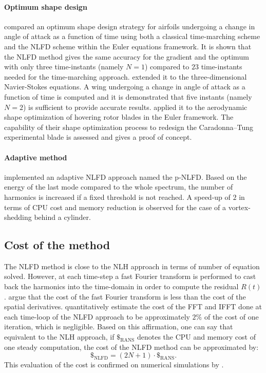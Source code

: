 \paragraph{Optimum shape design}
\citet{Nadarajah2003} compared an optimum shape design 
strategy for 
airfoils undergoing a change 
in angle of attack as a function of time 
using both a classical time-marching scheme
and the NLFD scheme within the Euler equations
framework. It is shown that the NLFD method
gives the same accuracy for the gradient and the optimum with only 
three time-instants (namely $N=1$)
compared to $23$ time-instants needed for 
the time-marching approach.
\citet{Nadarajah2007} extended it
to the three-dimensional Navier-Stokes equations.
A wing undergoing a change 
in angle of attack as a function of time is computed and
it is demonstrated that
five instants (namely $N=2$) is sufficient to provide
accurate results.
\citet{Tatossian2011} applied it
to the aerodynamic shape optimization of hovering rotor blades
in the Euler framework.
The capability of 
their shape optimization process
to redesign the Caradonna–Tung experimental 
blade is assessed and gives a proof
of concept.

\paragraph{Adaptive method}
\citet{Mosahebi2013} implemented an adaptive NLFD approach named
the p-NLFD. Based on the energy of the last mode compared
to the whole spectrum, the number of harmonics
is increased if a fixed threshold is not reached.
A speed-up of $2$ in terms of CPU cost and
memory reduction is observed for the case of a
vortex-shedding behind a cylinder.

\subsection{Cost of the method}
The NLFD method is close to the NLH approach in terms of number
of equation solved. However, at each time-step a fast Fourier transform
is performed to cast back the harmonics into the time-domain in order
to compute the residual $R(t)$. \citet{McMullen2006} argue
that the cost of the fast Fourier transform is less than the cost of 
the spatial derivatives. 
\citet{Kachra2008} quantitatively estimate the
cost of the FFT and IFFT done at each time-loop of the NLFD approach to be
approximately $2\%$ of the cost of one iteration, which is negligible.
Based on this affirmation, one can say that equivalent to the NLH
approach, if $\mathdollar_{\text{RANS}}$ 
denotes the CPU and memory cost of
one steady computation, the cost of the NLFD method can be 
approximated by:
\begin{equation}
	\mathdollar_{\text{NLFD}} = (2N+1) \cdot \mathdollar_{\text{RANS}}.
\end{equation}
This evaluation of the cost is confirmed on numerical
simulations by \citet{McMullen2002}.